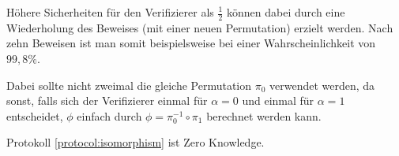 Höhere Sicherheiten für den Verifizierer als \( \frac{1}{2} \) können dabei durch eine Wiederholung des Beweises (mit einer neuen Permutation) erzielt werden. Nach zehn Beweisen ist man somit beispielsweise bei einer Wahrscheinlichkeit von \( 99,8 \% \).

Dabei sollte nicht zweimal die gleiche Permutation \( \pi_0 \) verwendet werden, da sonst, falls sich der Verifizierer einmal für \( \alpha = 0 \) und einmal für \( \alpha = 1 \) entscheidet, \( \phi \) einfach durch \( \phi = \pi_0^{-1} \circ \pi_1 \) berechnet werden kann.

\vspace{0.2cm}

\begin{theorem}
Protokoll \ref{protocol:isomorphism} ist Zero Knowledge.
\end{theorem}


